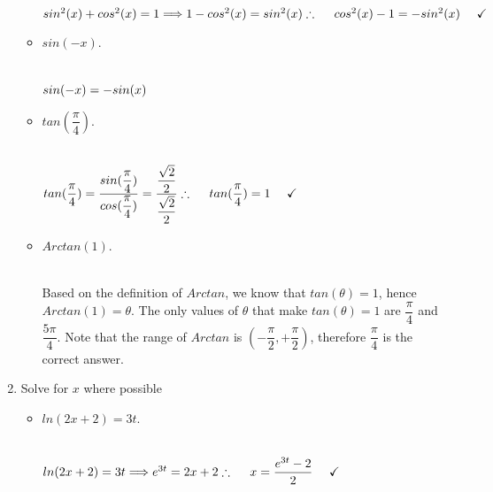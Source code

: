 \documentclass[fleqn]{article}
\begin{document}
\begin{enumerate}
\begin{itemize}
        \textcolor{hwColor}{
          \\
          $
            sin^2(x)+cos^2(x)=1 \Longrightarrow 1-cos^2(x)=sin^2(x)
            \\
            \\
            \\
            \therefore ~~~~ cos^{2}(x)-1=-sin^2(x) ~~~~ \checkmark
            \\
          $ 
        }

      \item $sin(-x)$.

        \textcolor{hwColor}{
          \\
          $
            sin(-x)=-sin(x)
            \\
          $
        }

      \item $tan(\dfrac{\pi}{4})$.

        \textcolor{hwColor}{
          \\
          $
            tan(\dfrac{\pi}{4})
            =\dfrac{sin(\dfrac{\pi}{4})}{cos(\dfrac{\pi}{4})}
            =\dfrac{\dfrac{\sqrt{2}}{2}}{\dfrac{\sqrt{2}}{2}}
            \\
            \\
            \\
            \therefore ~~~~ tan(\dfrac{\pi}{4})=1 ~~~~ \checkmark
            \\
          $
        }

      \item $Arctan(1)$.

        \textcolor{hwColor}{
          \\
          Based on the definition of $Arctan$, we know that $tan(\theta)=1$, hence $Arctan(1)=\theta$. 
          The only values of $\theta$ that make $tan(\theta)=1$ are $\dfrac{\pi}{4}$ and $\dfrac{5 \pi}{4}$.
          Note that the range of $Arctan$ is $\left(-\dfrac{\pi}{2}, +\dfrac{\pi}{2}\right)$, therefore
          $\dfrac{\pi}{4}$ is the correct answer.
          \\
        }

    \end{itemize}


    \item Solve for $x$ where possible
    \begin{itemize}
      \item $ln(2x+2)=3t$.

        \textcolor{hwColor}{
          \\
          $
            ln(2x+2)=3t \Longrightarrow e^{3t}=2x+2
            \\
            \\
            \\
            \therefore ~~~~ x=\dfrac{e^{3t}-2}{2} ~~~~ \checkmark
            \\
          $
        }


\end{itemize}
\end{enumerate}
\end{document}
